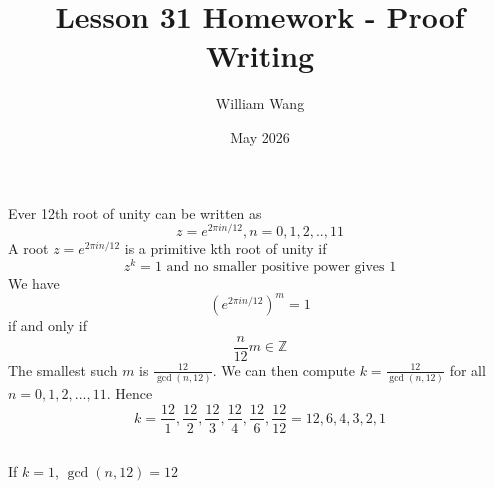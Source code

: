 \documentclass{article}
\title{Lesson 31 Homework - Proof Writing}
\author{William Wang}
\date{May 2026}
\begin{document}
\maketitle

\section{}
\subsection{}
Ever 12th root of unity can be written as
\[z = e^{2\pi in/12}, n = 0,1,2,..,11\]
A root \(z = e^{2\pi in/12}\) is a primitive kth root of unity if 
\[z^k = 1 \text{ and no smaller positive power gives 1}\]
We have 
\[(e^{2\pi i n/12})^m = 1 \]
if and only if 
\[\frac{n}{12}m \in \mathbb{Z}\]
The smallest such \(m\) is \(\frac{12}{\gcd(n,12)}\). We can then compute \(k = \frac{12}{\gcd(n,12)}\) for all \(n = 0,1,2,...,11\). Hence
\[k = \frac{12}{1}, \frac{12}{2}, \frac{12}{3}, \frac{12}{4}, \frac{12}{6}, \frac{12}{12} = 12,6,4,3,2,1\]

\subsection{}
If \(k = 1\), \(\gcd(n,12) = 12\)
\section{}
\subsection{}
\subsection{}
\end{document}
